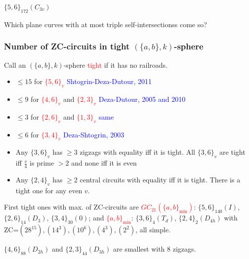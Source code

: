 \documentclass{beamer}
\begin{document}
\begin{frame}
\begin{center}
\begin{minipage}{4.5cm}
$\{5,6\}_{172}(C_{3v})$
\end{minipage}
\end{center}
Which plane curves with at most triple self-intersectionss come 
so?
\end{frame}


\begin{frame}\frametitle{Number of ZC-circuits in tight $(\{a,b\},k)$-sphere}
\vspace{-2.5mm}
Call an $(\{a,b\},k)$-sphere \textcolor{red}{tight}  if it has no
railroads.

\begin{itemize}
\item
$\le 15$ for \textcolor{red}{$\{5,6\}_v$} 
\textcolor{blue}{Shtogrin-Deza-Dutour, 2011} 
\item
$\le 9$ for \textcolor{red}{$\{4,6\}_v$} and 
\textcolor{red}{$\{2,3\}_v$}
\textcolor{blue}{Deza-Dutour, 2005 and 2010} 
\item
$\le 3$ for  \textcolor{red}{$\{2, 6\}_v$} and  
\textcolor{red}{$\{1, 3\}_v$}
\textcolor{blue}{same}
\item
$\le 6$ for \textcolor{red}{$\{3, 4\}_v$}
\textcolor{blue}{Deza-Shtogrin, 2003}
\item
Any $\{3,6\}_v$ has $\geq 3$ zigzags with equality iff it 
is 
tight.
All $\{3,6\}_v$
are tight iff $\frac{v}{4}$ is prime $>2$ and none iff it is even
\item
Any $\{2,4\}_v$ has $\geq 2$ central circuits with 
equality iff 
it is 
tight.
There is a tight one for any even $v$.
\end{itemize}
\pause

First tight ones with max.   of ZC-circuits are 
\textcolor{red}{$GC_{21}(\{a,b\}_{\min})$}: $\{5,6\}_{140}(I)$,
$\{2,6\}_{14}(D_3)$, 
$\{3,4\}_{30}(0)$; 
and \textcolor{red}{$\{a,b\}_{\min}$}: $\{3,6\}_{4}(T_d)$, 
$\{2,4\}_{2}(D_{4h})$ with
ZC=$(28^{15}), (14^3), (10^6), (4^3), (2^2)$, all 
simple.

$\{4,6\} 
_{88}(D_{2h})$ and $\{2,3\}_{44}(D_{3h})$ are smallest 
with  $8$ zigzags.
\end{frame}
\end{document}
